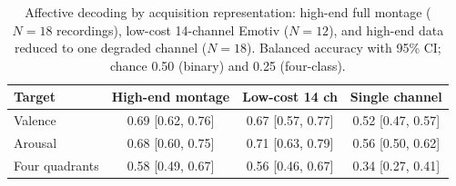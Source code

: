 \begin{table}[H]
  \centering
  \caption{Affective decoding by acquisition representation: high-end full montage
  ($N=18$ recordings), low-cost 14-channel Emotiv ($N=12$), and high-end data
  reduced to one degraded channel ($N=18$). Balanced accuracy with 95\% CI;
  chance 0.50 (binary) and 0.25 (four-class).}
  \label{tab:affective}
  \begin{tabular}{lccc}
    \hline
    Target & High-end montage & Low-cost 14 ch & Single channel \\
    \hline
    Valence & 0.69 [0.62, 0.76] & 0.67 [0.57, 0.77] & 0.52 [0.47, 0.57] \\
    Arousal & 0.68 [0.60, 0.75] & 0.71 [0.63, 0.79] & 0.56 [0.50, 0.62] \\
    Four quadrants & 0.58 [0.49, 0.67] & 0.56 [0.46, 0.67] & 0.34 [0.27, 0.41] \\
    \hline
  \end{tabular}
\end{table}
